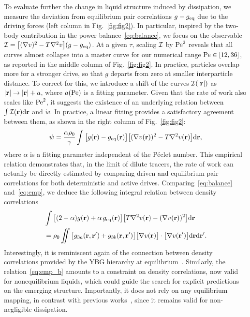 \documentclass[superscriptaddress, twocolumn, prx, longbibliography, nofootinbib]{revtex4-1}
\newcommand{\dd}{\text{d}}
\begin{document}
To evaluate further the change in liquid structure induced by dissipation, we measure the deviation from equilibrium pair correlations $g-g_{\rm eq}$ due to the driving forces (left column in Fig.~\ref{fig:fig2}). In particular, inspired by the two-body contribution in the power balance~\eqref{eq:balance}, we focus on the observable ${\cal I} = \big[(\nabla v)^2-T\nabla^2v\big](g - g_{\rm eq})$. At a given $\tau$, scaling ${\cal I}$ by ${\rm Pe}^2$ reveals that all curves almost collapse into a master curve for our numerical range ${\rm Pe}\in[12,36]$, as reported in the middle column of Fig.~\ref{fig:fig2}. In practice, particles overlap more for a stronger drive, so that $g$ departs from zero at smaller interparticle distance. To correct for this, we introduce a shift of the curves ${\cal I}(|{\bf r}|)$ as $|{\bf r}|\to |{\bf r}|+a$, where $a(\rm Pe)$ is a fitting parameter. Given that the rate of work also scales like ${\rm Pe}^2$, it suggests the existence of an underlying relation between $\int{\cal I}({\bf r}){\rm d}{\bf r}$ and $\dot w$. In practice, a linear fitting provides a satisfactory agreement between them, as shown in the right column of Fig.~\ref{fig:fig2}:
\begin{equation}\label{eq:emp}
	\dot w = \frac{\alpha\rho_0}{\gamma} \int \big[ g({\bf r}) - g_{\rm eq}({\bf r}) \big]\big[(\nabla v({\bf r}))^2-T\nabla^2v({\bf r})\big] {\rm d}{\bf r} ,
\end{equation}
where $\alpha$ is a fitting parameter independent of the P\'eclet number. This empirical relation demonstrates that, in the limit of dilute tracers, the rate of work can actually be directly estimated by comparing driven and equilibrium pair correlations for both deterministic and active drives. Comparing~\eqref{eq:balance} and~\eqref{eq:emp}, we deduce the following integral relation between density correlations
\begin{equation}\label{eq:emp_b}
	\begin{aligned}
		&\int \big[ (2-\alpha) g({\bf r}) + \alpha \,g_{\rm eq}({\bf r}) \big] \big[T \nabla^2 v({\bf r}) - (\nabla v({\bf r}))^2\big] \dd{\bf r}
		\\
		&= \rho_0 \iint\big[ g_{3a}({\bf r}, {\bf r}') + g_{3b}({\bf r}, {\bf r}')\big]  \big[\nabla v({\bf r})\big] \cdot \big[\nabla v({\bf r}')\big] \dd{\bf r} \dd{\bf r}' .
	\end{aligned}
\end{equation}
Interestingly, it is reminiscent again of the connection between density correlations provided by the YBG hierarchy at equilibrium~\cite{Hansen2013}. Similarly, the relation~\eqref{eq:emp_b} amounts to a constraint on density correlations, now valid for nonequilibrium liquids, which could guide the search for explicit predictions on the emerging structure. Importantly, it does not rely on any equilibrium mapping, in contrast with previous works~\cite{Maggi2015b, Rein2016, Wittmann2017}, since it remains valid for non-negligible dissipation.
\end{document}
